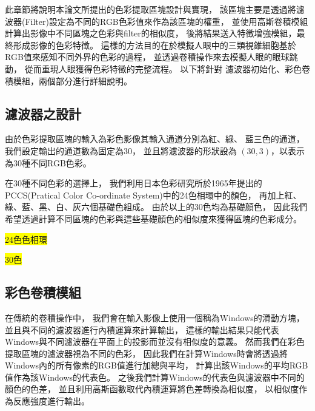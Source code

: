\documentclass[class=NCU_thesis, crop=false]{standalone}
\begin{document}
此章節將說明本論文所提出的色彩提取區塊設計與實現，
該區塊主要是透過將濾波器(Filter)設定為不同的RGB色彩值來作為該區塊的權重，
並使用高斯卷積模組計算出影像中不同區塊之色彩與filter的相似度，
後將結果送入特徵增強模組，最終形成影像的色彩特徵。
這樣的方法目的在於模擬人眼中的三類視錐細胞基於RGB值來感知不同外界的色彩的過程，
並透過卷積操作來去模擬人眼的眼球跳動，
從而重現人眼獲得色彩特徵的完整流程。
以下將針對 濾波器初始化、彩色卷積模組，兩個部分進行詳細說明。

	\subsection{濾波器之設計}
	由於色彩提取區塊的輸入為彩色影像其輸入通道分別為紅、綠、 藍三色的通道，
	我們設定輸出的通道數為固定為30，
	並且將濾波器的形狀設為 $\left(30 , 3\right)$，以表示為30種不同RGB色彩。

	在30種不同色彩的選擇上，
	我們利用日本色彩研究所於1965年提出的PCCS(Pratical Color Co-ordinate System)中的24色相環中的顏色，
	再加上紅、綠、藍、黑、白、灰六個基礎色組成。
	由於以上的30色均為基礎顏色，
	因此我們希望透過計算不同區塊的色彩與這些基礎顏色的相似度來獲得區塊的色彩成分。

	\colorbox {yellow}{24色色相環}

	\colorbox{yellow}{30色}

	\subsection{彩色卷積模組}
	在傳統的卷積操作中，
	我們會在輸入影像上使用一個稱為Windows的滑動方塊，
	並且與不同的濾波器進行內積運算來計算輸出，
	這樣的輸出結果只能代表Windows與不同濾波器在平面上的投影而並沒有相似度的意義。
	然而我們在彩色提取區塊的濾波器視為不同的色彩，
	因此我們在計算Windows時會將透過將Windows內的所有像素的RGB值進行加總與平均，
	計算出該Windows的平均RGB值作為該Windows的代表色。
	之後我們計算Windows的代表色與濾波器中不同的顏色的色差，
	並且利用高斯函數取代內積運算將色差轉換為相似度，
	以相似度作為反應強度進行輸出。
\end{document}
